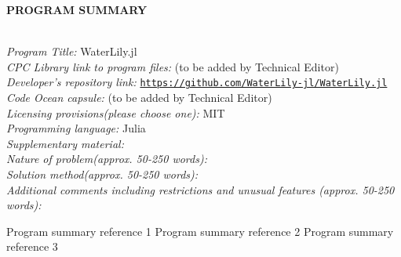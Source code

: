 \documentclass[final,3p,times]{elsarticle}
\begin{document}
{\bf PROGRAM SUMMARY}
\\
\\
\begin{small}
\noindent
{\em Program Title:} WaterLily.jl \\
{\em CPC Library link to program files:} (to be added by Technical Editor) \\
{\em Developer's repository link:} \href{https://github.com/WaterLily-jl/WaterLily.jl}{\texttt{https://github.com/WaterLily-jl/WaterLily.jl}} \\
{\em Code Ocean capsule:} (to be added by Technical Editor)\\
{\em Licensing provisions(please choose one):} MIT \\
{\em Programming language:} Julia \\
{\em Supplementary material:} \\
{\em Nature of problem(approx. 50-250 words):}\\
{\em Solution method(approx. 50-250 words):}\\
{\em Additional comments including restrictions and unusual features (approx. 50-250 words):}\\

\begin{thebibliography}{0}
Program summary reference 1         %
Program summary reference 2         %
Program summary reference 3         %
\end{thebibliography}
\end{small}
\end{document}
